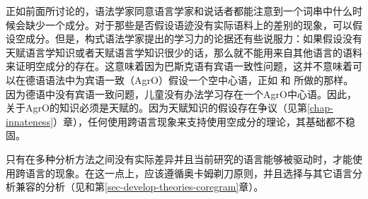 正如前面所讨论的，语法学家同意语言学家和说话者都能注意到一个词串中什么时候会缺少一个成分。对于那些是否假设语迹没有实际语料上的差别的现象，可以假设空成分。但是，构式语法学家提出的学习力的论据还有些说服力：如果假设没有天赋语言学知识或者天赋语言学知识很少的话，那么就不能用来自其他语言的语料来证明空成分的存在。这意味着因为巴斯克语有宾语一致性问题，这并不意味着可以在德语语法中为宾语一致（AgrO）假设一个空中心语，正如 \citet{Stechow96a}和 \citet{Meinunger2000a}所做的那样。因为德语中没有宾语一致问题，儿童没有办法学习存在一个AgrO中心语。因此，关于AgrO的知识必须是天赋的。因为天赋知识的假设存在争议（见第\ref{chap-innateness}）章），任何使用跨语言现象来支持使用空成分的理论，其基础都不稳固。

只有在多种分析方法之间没有实际差异并且当前研究的语言能够被驱动时，才能使用跨语言的现象。在这一点上，应该遵循奥卡姆剃刀原则，并且选择与其它语言分析兼容的分析（见\citealp{MuellerCoreGram}和第\ref{sec-develop-theories-coregram}章）。

